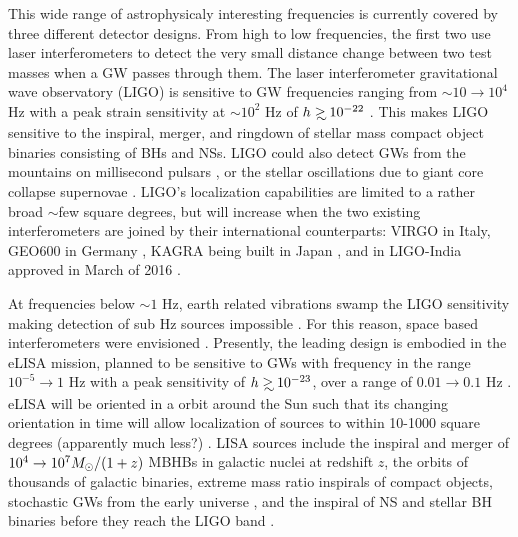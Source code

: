 This wide range of astrophysicaly interesting frequencies is currently covered
by three different detector designs. From high to low frequencies, the first
two use laser interferometers to detect the very small distance change between
two test masses when a GW passes through them. The laser interferometer
gravitational wave observatory (LIGO) is sensitive to GW frequencies ranging
from $\sim 10 \rightarrow 10^4$ Hz with a peak strain sensitivity at
$\sim10^{2}$ Hz of $h \gsim 10^{-22}$ \citep{aLIGO:2015}. This makes LIGO
sensitive to the inspiral, merger, and ringdown of stellar mass compact object
binaries consisting of BHs and NSs. LIGO could also detect GWs from the
mountains on millisecond pulsars \citep[\emph{e.g.}][and references therein]{ContWaveLIGO:2016}, 
or the stellar oscillations due to giant core
collapse supernovae \citep[\emph{e.g.}][and references therein]{SNLIGO:2016}.
LIGO's localization capabilities are limited to a rather broad $\sim$few
square degrees, but will increase when the two existing interferometers are
joined by their international counterparts: VIRGO \citep{Acernese:2015} in
Italy, GEO600 in Germany \citep{Dooley:2015}, KAGRA being built in Japan
\citep{Tomaru:2016}, and in LIGO-India approved in March of 2016 \citep{LIGOIndia}.

At frequencies below $\sim 1$ Hz, earth related vibrations swamp the LIGO
sensitivity making detection of sub Hz sources impossible \citep{aLIGO:2015}.
For this reason, space based interferometers were envisioned
\citep{ThorneBraginsky:1976}. Presently, the leading design is embodied in the
eLISA mission, planned to be sensitive to GWs with frequency in the range
$10^{-5} \rightarrow 1$ Hz with a peak sensitivity of $h \gsim 10^{-23}$, over
a range of $0.01 \rightarrow 0.1$ Hz \citep{eLISA:AmaroSeoane:2013}. eLISA
will be oriented in a orbit around the Sun such that its changing orientation
in time will allow localization of sources to within 10-1000 square degrees
(apparently much less?) \citep{eLISA:AmaroSeoane:2013}. LISA sources include
the inspiral and merger of $10^4 \rightarrow 10^7 {M_{\odot}}/(1+z)$ MBHBs in
galactic nuclei at redshift $z$, the orbits of thousands of galactic binaries,
extreme mass ratio inspirals of compact objects, stochastic GWs from the early
universe \citep{eLISA:AmaroSeoane:2013}, and the inspiral of NS and stellar BH
binaries before they reach the LIGO band 
\citep[\emph{e.g.}][and references therein]{Sesana:LISALIGO:2016}.

